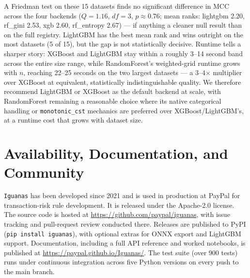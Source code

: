 \documentclass[twoside,11pt]{article}
\begin{document}
A Friedman test on these 15 datasets finds no significant difference in MCC
across the four backends ($Q=1.16$, $df=3$, $p\approx0.76$; mean ranks:
lightgbm 2.20, rf\_gini 2.53, xgb 2.60, rf\_entropy 2.67) --- if anything a
cleaner null result than on the full registry. LightGBM has the best mean
rank and wins outright on the most datasets (5 of 15), but the gap is not
statistically decisive. Runtime tells a sharper story: XGBoost and LightGBM
stay within a roughly 3--14 second band across the entire size range, while
RandomForest's weighted-grid runtime grows with $n$, reaching 22--25 seconds
on the two largest datasets --- a 3--4$\times$ multiplier over XGBoost at
equivalent, statistically indistinguishable quality. We therefore recommend
LightGBM or XGBoost as the default backend at scale, with RandomForest
remaining a reasonable choice where its native categorical handling or
\texttt{monotonic\_cst} mechanics are preferred over XGBoost/LightGBM's, at a
runtime cost that grows with dataset size.

\section{Availability, Documentation, and Community}

\texttt{Iguanas} has been developed since 2021 and is used in production at
PayPal for transaction-risk rule development. It is released under the
Apache-2.0 license. The source code is hosted at
\url{https://github.com/paypal/iguanas}, with issue tracking and pull-request
review conducted there. Releases are published to PyPI
(\texttt{pip install iguanas}), with optional extras for ONNX export and
LightGBM support. Documentation, including a full API reference and worked
notebooks, is published at \url{https://paypal.github.io/Iguanas/}. The test
suite (over 900 tests) runs under continuous integration across five Python
versions on every push to the main branch.


\vskip 0.2in

\end{document}
